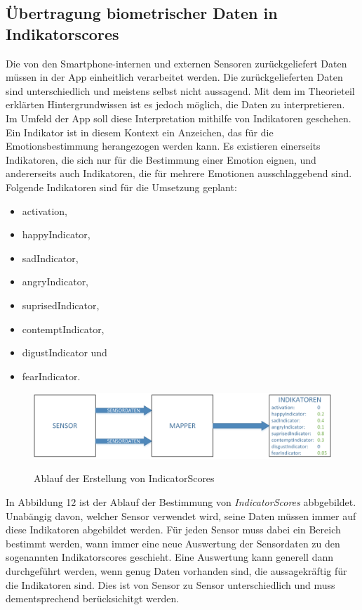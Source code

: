 \subsection{Übertragung biometrischer Daten in Indikatorscores}
Die von den Smartphone-internen und externen Sensoren zurückgeliefert Daten müssen in der App einheitlich verarbeitet werden. Die zurückgelieferten Daten sind unterschiedlich und meistens selbst nicht aussagend. Mit dem im Theorieteil erklärten Hintergrundwissen ist es jedoch möglich, die Daten zu interpretieren. \newline 
Im Umfeld der App soll diese Interpretation mithilfe von Indikatoren geschehen. Ein Indikator ist in diesem Kontext ein Anzeichen, das für die Emotionsbestimmung herangezogen werden kann. Es existieren einerseits Indikatoren, die sich nur für die Bestimmung einer Emotion eignen, und andererseits auch Indikatoren, die für mehrere Emotionen ausschlaggebend sind. Folgende Indikatoren sind für die Umsetzung geplant: 
\begin{itemize}[noitemsep, topsep=0pt]
	\item activation,
	\item happyIndicator,
	\item sadIndicator,
    \item angryIndicator,
    \item suprisedIndicator,
    \item contemptIndicator,
    \item digustIndicator und
    \item fearIndicator.
\end{itemize}
\begin{figure}[h]
	\centering
	\includegraphics[width=16cm]{Bilder/indicatorscore.png}
	\label{img:Ablauf Erstellung Indicatorscores}
	\caption[Ablauf der Erstellung von IndicatorScores]{Ablauf der Erstellung von IndicatorScores}
\end{figure}%
In Abbildung 12 ist der Ablauf der Bestimmung von \textit{IndicatorScores} abbgebildet. Unabängig davon, welcher Sensor verwendet wird, seine Daten müssen immer auf diese Indikatoren abgebildet werden. Für jeden Sensor muss dabei ein Bereich bestimmt werden, wann immer eine neue Auswertung der Sensordaten zu den sogenannten Indikatorscores geschieht. Eine Auswertung kann generell dann durchgeführt werden, wenn genug Daten vorhanden sind, die aussagekräftig für die Indikatoren sind. Dies ist von Sensor zu Sensor unterschiedlich und muss dementsprechend berücksichitgt werden. \newline
